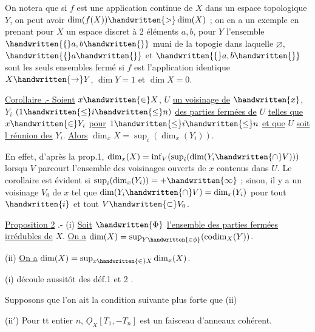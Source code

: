 
On notera que si $f$ est une application continue de $X$ dans un espace topologique $Y$, on peut avoir $\dim(f(X))\handwritten{>}\dim(X)$ ; on en a un exemple en prenant pour $X$ un espace discret à 2 éléments $a,b$, pour $Y$ l'ensemble $\handwritten{\{}a,b\handwritten{\}}$ muni de la topogie dans laquelle $\varnothing$, $\handwritten{\{}a\handwritten{\}}$ et $\handwritten{\{}a,b\handwritten{\}}$ sont les seuls ensembles fermé si $f$ est l'application identique $X\handwritten{\to}Y$, $\dim Y=1$ et $\dim X=0$.

\uline{Corollaire .- Soient} $x\handwritten{\in}X$, $U$ \uline{un voisinage de} $\handwritten{x}$, $Y_i$ $(1\handwritten{\leq}i\handwritten{\leq}n)$ \uline{des parties fermées de} $U$ \uline{telles que} $x\handwritten{\in}Y_i$ \uline{pour} $1\handwritten{\leq}i\handwritten{\leq}n$ \uline{et que} $U$ \uline{soit l réunion des} $Y_i$. \uline{Alors} $\dim_x X=\sup_i(\dim_x(Y_i))$.

En effet, d'après la prop.1, $\dim_x(X)=\inf_V(\sup_i(\dim(Y_i\handwritten{\cap}V)))$ lorsqu $V$ parcourt l'ensemble des voisinages ouverts de $x$ contenus dans $U$. Le corollaire est évident si $\sup_i(\dim_x(Y_i))=+\handwritten{\infty}$ ; sinon, il y a un voisinage $V_0$ de $x$ tel que  $\dim(Y_i\handwritten{\cap}V)=\dim_x(Y_i)$ pour tout $\handwritten{i}$ et tout $V\handwritten{\subset}V_0$.

\uline{Proposition 2} .- (i) \uline{Soit} $\handwritten{\Phi}$ \uline{l'ensemble des parties fermées irrédubles de} $X$. \uline{On a} $\dim(X)=\sup_{Y\handwritten{\in\phi}}(\operatorname{codim}_X(Y))$.

(ii) \uline{On a} $\dim(X)=\sup_{x\handwritten{\in}X}\dim_x(X)$.

(i) découle aussitôt des déf.1 et 2 . 

   Supposons que l'on ait la condition  suivante plus forte que (ii)

(ii$'$)  Pour tt entier $n$, $\underline O_X[T_1,-T_n]$ est un faisceau d'anneaux cohérent.

